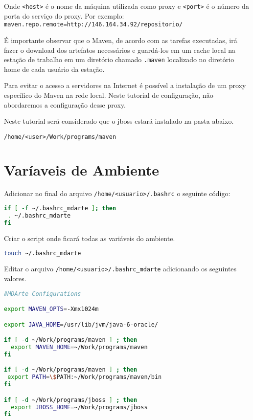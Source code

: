 Onde \texttt{<host>} é o nome da máquina utilizada como proxy e \texttt{<port>} é o número da porta do serviço do proxy. Por exemplo: \texttt{maven.repo.remote=http://146.164.34.92/repositorio/}

É importante observar que o Maven, de acordo com as tarefas executadas, irá fazer o download dos artefatos necessários e guardá-los em um cache local na estação de trabalho em um diretório chamado \texttt{.maven} localizado no diretório home de cada usuário da estação. 

Para evitar o acesso a servidores na Internet é possível a instalação de um proxy específico do Maven na rede local. Neste tutorial de configuração, não abordaremos a configuração desse proxy.

Neste tutorial será considerado que o jboss estará instalado na pasta abaixo.

\begin{verbatim}
/home/<user>/Work/programs/maven
\end{verbatim}

\section{Varíaveis de Ambiente}

Adicionar no final do arquivo \texttt{/home/<usuario>/.bashrc} o seguinte código: 

\begin{lstlisting}[language=bash]
if [ -f ~/.bashrc_mdarte ]; then
 . ~/.bashrc_mdarte
fi
\end{lstlisting}

Criar o script onde ficará todas as variáveis do ambiente. 

\begin{lstlisting}[language=bash]
touch ~/.bashrc_mdarte
\end{lstlisting}
	
Editar o arquivo \texttt{/home/<usuario>/.bashrc\_mdarte} adicionando os seguintes valores. 

\begin{lstlisting}[language=bash]
#MDArte Configurations

export MAVEN_OPTS=-Xmx1024m

export JAVA_HOME=/usr/lib/jvm/java-6-oracle/

if [ -d ~/Work/programs/maven ] ; then
  export MAVEN_HOME=~/Work/programs/maven
fi

if [ -d ~/Work/programs/maven ] ; then
 export PATH=\$PATH:~/Work/programs/maven/bin
fi

if [ -d ~/Work/programs/jboss ] ; then
  export JBOSS_HOME=~/Work/programs/jboss
fi
\end{lstlisting}


